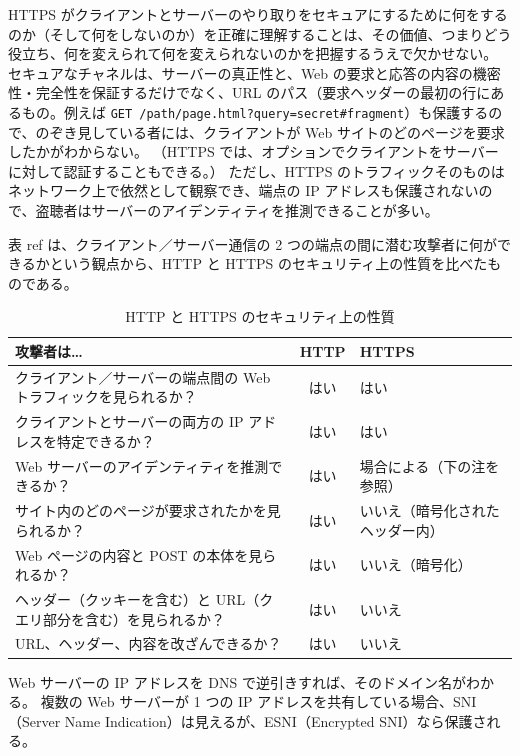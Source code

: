 \documentclass[uplatex]{jsarticle}
\def\ref#1{ref}%
\def\label#1{}%
\begin{document}
HTTPS がクライアントとサーバーのやり取りをセキュアにするために何をするのか（そして何をしないのか）を正確に理解することは、その価値、つまりどう役立ち、何を変えられて何を変えられないのかを把握するうえで欠かせない。
セキュアなチャネルは、サーバーの真正性と、Web の要求と応答の内容の機密性・完全性を保証するだけでなく、URL のパス（要求ヘッダーの最初の行にあるもの。例えば \texttt{GET /path/page.html?query=secret\#fragment}）も保護するので、のぞき見している者には、クライアントが Web サイトのどのページを要求したかがわからない。
（HTTPS では、オプションでクライアントをサーバーに対して認証することもできる。）
ただし、HTTPS のトラフィックそのものはネットワーク上で依然として観察でき、端点の IP アドレスも保護されないので、盗聴者はサーバーのアイデンティティを推測できることが多い。

表 \ref{tab:ch11-http-vs-https} は、クライアント／サーバー通信の 2 つの端点の間に潜む攻撃者に何ができるかという観点から、HTTP と HTTPS のセキュリティ上の性質を比べたものである。

\begin{table}[H]
\centering
\caption{HTTP と HTTPS のセキュリティ上の性質}\label{tab:ch11-http-vs-https}
\small
\begin{tabularx}{\textwidth}{|X|c|l|}
\hline
攻撃者は\ldots & HTTP & HTTPS \\
\hline
クライアント／サーバーの端点間の Web トラフィックを見られるか？ & はい & はい \\
\hline
クライアントとサーバーの両方の IP アドレスを特定できるか？ & はい & はい \\
\hline
Web サーバーのアイデンティティを推測できるか？ & はい & 場合による（下の注を参照） \\
\hline
サイト内のどのページが要求されたかを見られるか？ & はい & いいえ（暗号化されたヘッダー内） \\
\hline
Web ページの内容と POST の本体を見られるか？ & はい & いいえ（暗号化） \\
\hline
ヘッダー（クッキーを含む）と URL（クエリ部分を含む）を見られるか？ & はい & いいえ \\
\hline
URL、ヘッダー、内容を改ざんできるか？ & はい & いいえ \\
\hline
\end{tabularx}
\end{table}

\begin{rem}[サーバーのアイデンティティの推測]\label{rem:ch11-server-identity}
Web サーバーの IP アドレスを DNS で逆引きすれば、そのドメイン名がわかる。
複数の Web サーバーが 1 つの IP アドレスを共有している場合、SNI（Server Name Indication）は見えるが、ESNI（Encrypted SNI）なら保護される。
\end{rem}
\end{document}
